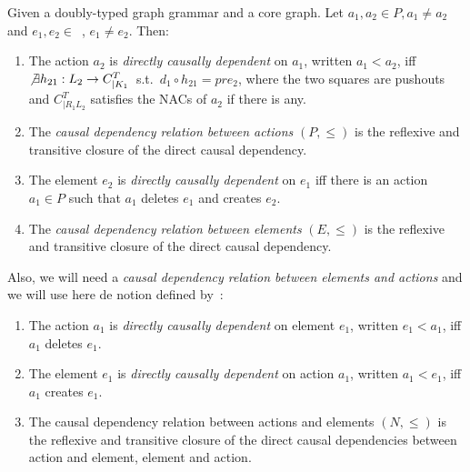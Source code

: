 \begin{definition} Given \doublyTypedGraphGrammarCore{} a doubly-typed graph grammar and \coreGraph{} a core graph. Let $a_1, a_2 \in P, a_1 \ne a_2$ and \mbox{$e_1, e_2 \in $ \coreGraph{},} $e_1 \ne e_2$. Then: 

  \begin{enumerate}
    \item The action $a_2$ is \emph{directly causally dependent} on $a_1$, written $a_1 < a_2$, iff \mbox{$\not\exists h_{21} : L_2 \rightarrow C^T_{|K_1}$ s.t. \mbox{$d_1 \circ h_{21} = pre_2$}}, where the two squares are pushouts and $C^T_{|R_1L_2}$ satisfies the NACs of $a_2$ if there is any.

   \item The \emph{causal dependency relation between actions} $(P, \leq)$ is the reflexive and transitive closure of the direct causal dependency.
     \item The element $e_2$ is \emph{directly causally dependent} on $e_1$ iff there is an action $a_1 \in P$ such that $a_1$ deletes $e_1$ and creates $e_2$.
    \item The \emph{causal dependency relation between elements} $(E, \leq)$ is the reflexive and transitive closure of the direct causal dependency.
  \end{enumerate}

  Also, we will need a \emph{causal dependency relation between elements and actions} and we will use here de notion defined by~\cite{Corradini1996}:

  \begin{enumerate}\addtocounter{enumi}{4}
    \item The action $a_1$ is \emph{directly causally dependent} on element $e_1$, written $e_1 < a_1$, iff $a_1$ deletes $e_1$. 
    \item The element $e_1$ is \emph{directly causally dependent} on action $a_1$, written $a_1 < e_1$, iff $a_1$ creates $e_1$.
    \item The causal dependency relation between actions and elements $(N, \leq)$ is the reflexive and transitive closure of the direct causal dependencies between action and element, element and action.
  \end{enumerate}
\end{definition}


